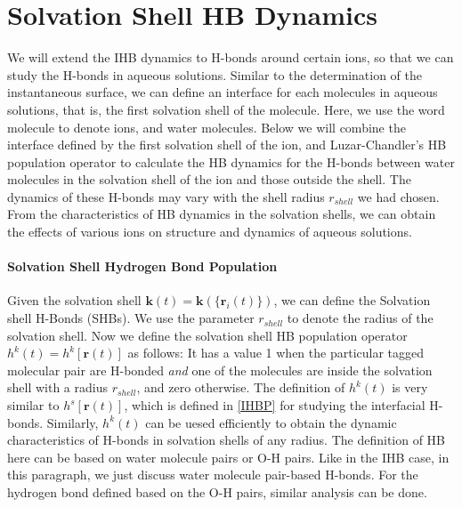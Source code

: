 \FloatBarrier
\section{Solvation Shell HB Dynamics} \label{SHB_dynamics}
We will extend the IHB dynamics to H-bonds around certain ions, so that we can study the H-bonds in aqueous solutions. 
Similar to the determination of the instantaneous surface, we can define an interface for each molecules in aqueous solutions, that is, 
the first solvation shell of the molecule. Here, we use the word molecule to denote ions, and water molecules.  
Below we will combine the interface defined by the first solvation shell of the ion, 
and Luzar-Chandler's HB population operator \cite{AL96} to calculate the HB
dynamics for the H-bonds between water molecules in the solvation shell of the ion and those outside the shell. 
The dynamics of these H-bonds may vary with the shell radius $r_{shell}$ we had chosen.
From the characteristics of HB dynamics in the solvation shells, we can obtain the effects of various ions on structure and dynamics of aqueous solutions. 

\paragraph{Solvation Shell Hydrogen Bond Population}
Given the solvation shell ${\mathbf k}(t)={\mathbf k}(\{{\mathbf r}_i(t)\})$, we can define the Solvation shell H-Bonds (SHBs).
We use the parameter $r_{shell}$ to denote the radius of the solvation shell.
Now we define the solvation shell HB population operator $h^{k}(t) = h^{k}[{\mathbf r}(t)]$ as follows:
It has a value 1 when the particular tagged molecular pair are H-bonded \emph{and} one of the molecules are inside the solvation shell
with a radius $r_{shell}$, and zero otherwise. 
The definition of $h^{k}(t)$ is very similar to $h^{s}[{\mathbf r}(t)]$, which is defined in \ref{IHBP} for studying the interfacial H-bonds.
Similarly, $h^{k}(t)$ can be uesed efficiently to obtain the dynamic characteristics of H-bonds in solvation shells of any radius. 
The definition of HB here can be based on water molecule pairs or O-H pairs. 
Like in the IHB case, in this paragraph, we just discuss water molecule pair-based H-bonds. 
For the hydrogen bond defined based on the O-H pairs, similar analysis can be done.

